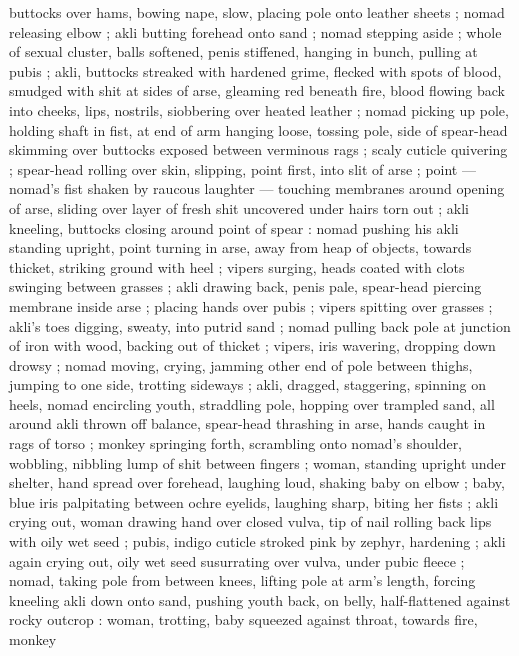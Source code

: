 buttocks over hams, bowing nape, slow, placing pole onto leather 
sheets ; nomad releasing elbow ; akli butting forehead onto sand ; 
nomad stepping aside ; whole of sexual cluster, balls softened, penis 
stiffened, hanging in bunch, pulling at pubis ; akli, buttocks streaked 
with hardened grime, flecked with spots of blood, smudged with shit 
at sides of arse, gleaming red beneath fire, blood flowing back into 
cheeks, lips, nostrils, siobbering over heated leather ; nomad picking 
up pole, holding shaft in fist, at end of arm hanging loose, tossing 
pole, side of spear-head skimming over buttocks exposed between 
verminous rags ; scaly cuticle quivering ; spear-head rolling over 
skin, slipping, point first, into slit of arse ; point --- nomad's fist 
shaken by raucous laughter --- touching membranes around opening 
of arse, sliding over layer of fresh shit uncovered under hairs torn 
out ; akli kneeling, buttocks closing around point of spear : nomad 
pushing his akli standing upright, point turning in arse, away from 
heap of objects, towards thicket, striking ground with heel ; vipers 
surging, heads coated with clots swinging between grasses ; akli 
drawing back, penis pale, spear-head piercing membrane inside arse 
; placing hands over pubis ; vipers spitting over grasses ; akli's toes 
digging, sweaty, into putrid sand ; nomad pulling back pole at 
junction of iron with wood, backing out of thicket ; vipers, iris 
wavering, dropping down drowsy ; nomad moving, crying, jamming 
other end of pole between thighs, jumping to one side, trotting 
sideways ; akli, dragged, staggering, spinning on heels, nomad 
encircling youth, straddling pole, hopping over trampled sand, all 
around akli thrown off balance, spear-head thrashing in arse, hands 
caught in rags of torso ; monkey springing forth, scrambling onto 
nomad's shoulder, wobbling, nibbling lump of shit between fingers ; 
woman, standing upright under shelter, hand spread over forehead, 
laughing loud, shaking baby on elbow ; baby, blue iris palpitating 
between ochre eyelids, laughing sharp, biting her fists ; akli crying 
out, woman drawing hand over closed vulva, tip of nail rolling back 
lips with oily wet seed ; pubis, indigo cuticle stroked pink by zephyr, 
hardening ; akli again crying out, oily wet seed susurrating over 
vulva, under pubic fleece ; nomad, taking pole from between knees, 
lifting pole at arm's length, forcing kneeling akli down onto sand, 
pushing youth back, on belly, half-flattened against rocky outcrop : 
woman, trotting, baby squeezed against throat, towards fire, monkey 
